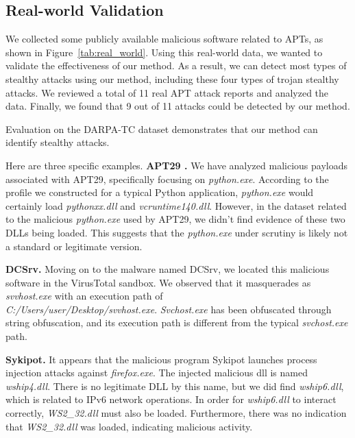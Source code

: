\subsection{Real-world Validation}
\label{sec-real-world}

We collected some publicly available malicious software related to APTs, as shown in Figure~\ref{tab:real_world}.
Using this real-world data, we wanted to validate the effectiveness of our method. As a result, we can detect most types of stealthy attacks using our method, including these four types of trojan stealthy attacks.
We reviewed a total of 11 real APT attack reports and analyzed the data. Finally, we found that 9 out of 11 attacks could be detected by our method.

Evaluation on the DARPA-TC dataset demonstrates that our method can identify stealthy attacks.

Here are three specific examples.
\noindent
{\bf APT29 \cite{mitre_g0016}.}
We have analyzed malicious payloads associated with APT29, specifically focusing on \textit{python.exe}. According to the profile we constructed for a typical Python application, \textit{python.exe} would certainly load \textit{pythonxx.dll} and \textit{vcruntime140.dll}. However, in the dataset related to the malicious \textit{python.exe} used by APT29, we didn't find evidence of these two DLLs being loaded. This suggests that the \textit{python.exe} under scrutiny is likely not a standard or legitimate version.

\noindent
{\bf DCSrv\cite{checkpoint2021}.}
Moving on to the malware named DCSrv, we located this malicious software in the VirusTotal sandbox. We observed that it masquerades as \textit{svvhost.exe} with an execution path of \\ \textit{C:/Users/user/Desktop/svvhost.exe}. \textit{Svchost.exe} has been obfuscated through string obfuscation, and its execution path is different from the typical \textit{svchost.exe} path.

\noindent
{\bf Sykipot\cite{att2023}.}
It appears that the malicious program Sykipot launches process injection attacks against \textit{firefox.exe}. The injected malicious dll is named \textit{wship4.dll}. There is no legitimate DLL by this name, but we did find \textit{wship6.dll}, which is related to IPv6 network operations. In order for \textit{wship6.dll} to interact correctly, \textit{WS2\_32.dll} must also be loaded. Furthermore, there was no indication that \textit{WS2\_32.dll} was loaded, indicating malicious activity.











